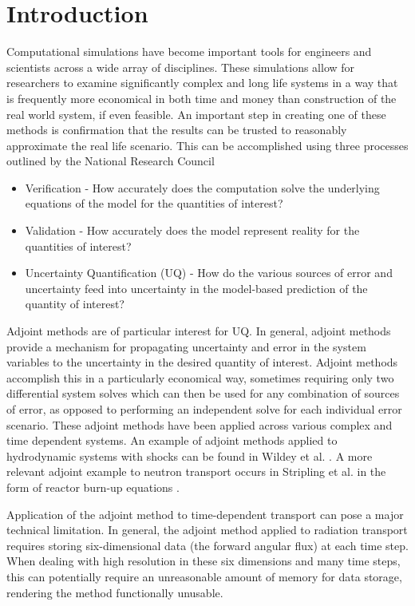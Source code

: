 \documentclass[12pt]{report}
\begin{document}
\section{Introduction}

Computational simulations have become important tools for engineers and scientists across a wide array of disciplines. These simulations allow for researchers to examine significantly complex and long life systems in a way that is frequently more economical in both time and money than construction of the real world system, if even feasible. An important step in creating one of these methods is confirmation that the results can be trusted to reasonably approximate the real life scenario. This can be accomplished using three processes outlined by the National Research Council \cite{NRCVVUQ}


\begin{itemize}
\item Verification - How accurately does the computation solve the underlying equations of the model for the quantities of interest?
\item Validation - How accurately does the model represent reality for the quantities of interest?
\item Uncertainty Quantification (UQ) -  How do the various sources of error and uncertainty feed into uncertainty in the model-based prediction of the quantity of interest?
\end{itemize}

Adjoint methods are of particular interest for UQ. In general, adjoint methods provide a mechanism for propagating uncertainty and error in the system variables to the uncertainty in the desired quantity of interest. Adjoint methods accomplish this in a particularly economical way, sometimes requiring only two differential system solves which can then be used for any combination of sources of error, as opposed to performing an independent solve for each individual error scenario. These adjoint methods have been applied across various complex and time dependent systems. An example of adjoint methods applied to hydrodynamic systems with shocks can be found in Wildey et al. \cite{Wildey}. A more relevant adjoint example to neutron transport occurs in Stripling et al. in the form of reactor burn-up equations \cite{Stripling}.


Application of the adjoint method to time-dependent transport can pose a major technical limitation. In general, the adjoint method applied to radiation transport requires storing six-dimensional data (the forward angular flux) at each time step. When dealing with high resolution in these six dimensions and many time steps, this can potentially require an unreasonable amount of memory for data storage, rendering the method functionally unusable. 
\end{document}

